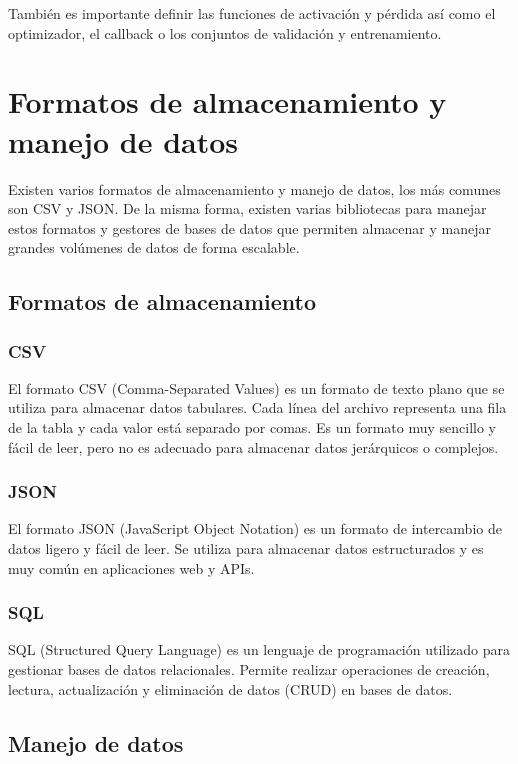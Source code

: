 También es importante definir las funciones de activación y pérdida así como el optimizador, el callback o los conjuntos de validación y entrenamiento.

\section{Formatos de almacenamiento y manejo de datos}

Existen varios formatos de almacenamiento y manejo de datos, los más comunes son CSV y JSON. 
De la misma forma, existen varias bibliotecas para manejar estos formatos y gestores de bases de datos que permiten almacenar y manejar grandes volúmenes de datos de forma escalable.

\subsection{Formatos de almacenamiento}

\subsubsection{CSV}

El formato CSV (Comma-Separated Values) es un formato de texto plano que se utiliza para almacenar datos tabulares.
Cada línea del archivo representa una fila de la tabla y cada valor está separado por comas.
Es un formato muy sencillo y fácil de leer, pero no es adecuado para almacenar datos jerárquicos o complejos.

\subsubsection{JSON}
El formato JSON (JavaScript Object Notation) es un formato de intercambio de datos ligero y fácil de leer.
Se utiliza para almacenar datos estructurados y es muy común en aplicaciones web y APIs.

\subsubsection{SQL}
SQL (Structured Query Language) es un lenguaje de programación utilizado para gestionar bases de datos relacionales.
Permite realizar operaciones de creación, lectura, actualización y eliminación de datos (CRUD) en bases de datos.

\subsection{Manejo de datos}


